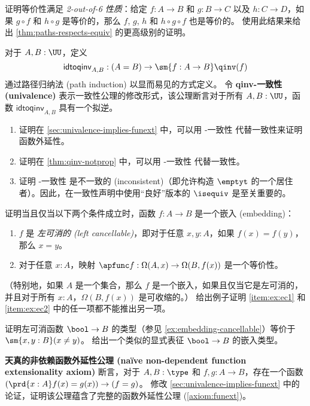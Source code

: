 \begin{ex}\label{ex:2-out-of-6}
%
证明等价性满足 \emph{2-out-of-6 性质}：给定 $f:A\to B$ 和 $g:B\to C$ 以及 $h:C\to D$，如果 $g\circ f$ 和 $h\circ g$ 是等价的，那么 $f$, $g$, $h$ 和 $h\circ g\circ f$ 也是等价的。
使用此结果来给出 \cref{thm:paths-respects-equiv} 的更高级别的证明。
\end{ex}

\begin{ex}\label{ex:qinv-univalence}
对于 $A,B:\UU$，定义
\[ \mathsf{idtoqinv}_{A,B} :(A=B) \to \sm{f:A\to B}\qinv(f) \]
通过路径归纳法 (path induction) 以显而易见的方式定义。
令 \textbf{\textsf{qinv}-一致性 (univalence)} 表示一致性公理的修改形式，该公理断言对于所有 $A,B:\UU$，函数 $\mathsf{idtoqinv}_{A,B}$ 具有一个拟逆。
\begin{enumerate}
  \item 证明在 \cref{sec:univalence-implies-funext} 中，可以用 \qinv-一致性 代替一致性来证明函数外延性。
  \item 证明在 \cref{thm:qinv-notprop} 中，可以用 \qinv-一致性 代替一致性。
  \item 证明 \qinv-一致性 是不一致的 (inconsistent)（即允许构造 $\emptyt$ 的一个居住者）。因此，在一致性声明中使用“良好”版本的 $\isequiv$ 是至关重要的。
\end{enumerate}
\end{ex}

\begin{ex}\label{ex:embedding-cancellable}
证明当且仅当以下两个条件成立时，函数 $f:A\to B$ 是一个嵌入 (embedding)：
\begin{enumerate}
  \item $f$ 是 \emph{左可消的 (left cancellable)}，即对于任意 $x,y:A$，如果 $f(x)=f(y)$，那么 $x=y$。\label{item:ex:ec1}
  \item 对于任意 $x:A$，映射 $\apfunc f: \Omega(A,x) \to \Omega(B,f(x))$ 是一个等价性。\label{item:ex:ec2}
\end{enumerate}
（特别地，如果 $A$ 是一个集合，那么 $f$ 是一个嵌入，如果且仅当它是左可消的，并且对于所有 $x:A$，$\Omega(B,f(x))$ 是可收缩的。）
给出例子证明 \ref{item:ex:ec1} 和 \ref{item:ex:ec2} 中的任一项都不能推出另一项。
\end{ex}

\begin{ex}\label{ex:cancellable-from-bool}
证明左可消函数 $\bool\to B$ 的类型（参见 \cref{ex:embedding-cancellable}）等价于 $\sm{x,y:B}(x\neq y)$。
给出一个类似的显式表征 $\bool\to B$ 的嵌入类型。
\end{ex}

\begin{ex}\label{ex:funext-from-nondep}
\textbf{天真的非依赖函数外延性公理 (na\"{i}ve non-dependent function extensionality axiom)} 断言，对于 $A,B:\type$ 和 $f,g:A\to B$，存在一个函数 $(\prd{x:A} f(x)=g(x)) \to (f=g)$。
%
修改 \cref{sec:univalence-implies-funext} 中的论证，证明该公理蕴含了完整的函数外延性公理 (\cref{axiom:funext})。
\end{ex}

